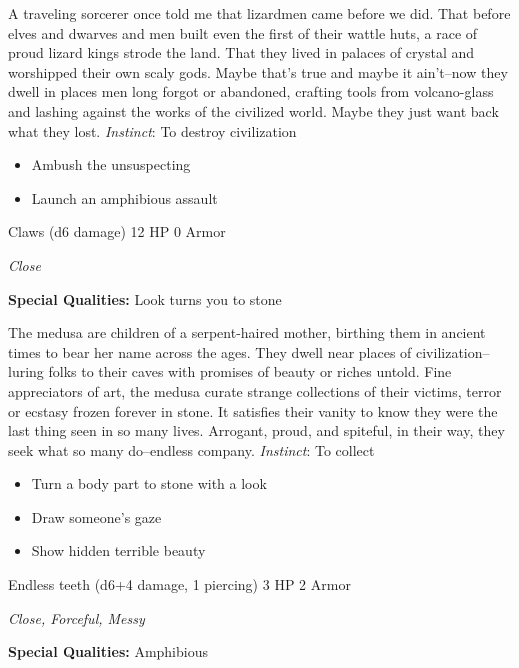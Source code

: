 \HRule
A traveling sorcerer once told me that lizardmen came before we did. That before elves and dwarves and men built even the first of their wattle huts, a race of proud lizard kings strode the land. That they lived in palaces of crystal and worshipped their own scaly gods. Maybe that's true and maybe it ain't--now they dwell in places men long forgot or abandoned, crafting tools from volcano-glass and lashing against the works of the civilized world. Maybe they just want back what they lost. \emph{Instinct}: To destroy civilization
\begin{itemize}
\item Ambush the unsuspecting
\item Launch an amphibious assault
\end{itemize}
\newpage
\HRule
{}

Claws (d6 damage)\hspace*{\fill} 12 HP 0 Armor

\emph{Close}

\textbf{Special Qualities:}
Look turns you to stone

\HRule
The medusa are children of a serpent-haired mother, birthing them in ancient times to bear her name across the ages. They dwell near places of civilization--luring folks to their caves with promises of beauty or riches untold. Fine appreciators of art, the medusa curate strange collections of their victims, terror or ecstasy frozen forever in stone. It satisfies their vanity to know they were the last thing seen in so many lives. Arrogant, proud, and spiteful, in their way, they seek what so many do--endless company. \emph{Instinct}: To collect
\begin{itemize}
\item Turn a body part to stone with a look
\item Draw someone's gaze
\item Show hidden terrible beauty
\end{itemize}

\HRule
{}

Endless teeth (d6+4 damage, 1 piercing)\hspace*{\fill} 3 HP 2 Armor

\emph{Close, Forceful, Messy}

\textbf{Special Qualities:}
Amphibious

